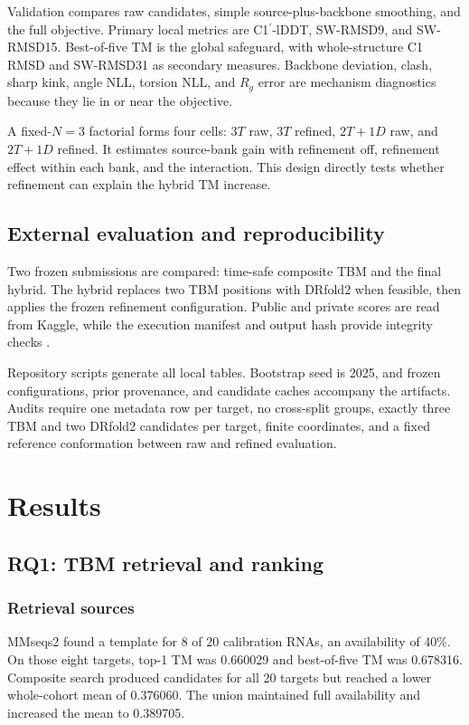 \documentclass[12pt,a4paper,oneside]{report}
\newcommand{\cprime}{C1$^{\prime}$}
\begin{document}
Validation compares raw candidates, simple source-plus-backbone smoothing, and the full
objective. Primary local metrics are \cprime{}-lDDT, SW-RMSD9, and SW-RMSD15. Best-of-five
TM is the global safeguard, with whole-structure C1 RMSD and SW-RMSD31 as secondary
measures. Backbone deviation, clash, sharp kink, angle NLL, torsion NLL, and $R_g$ error
are mechanism diagnostics because they lie in or near the objective.

A fixed-$N=3$ factorial forms four cells: $3T$ raw, $3T$ refined, $2T+1D$ raw, and
$2T+1D$ refined. It estimates source-bank gain with refinement off, refinement effect
within each bank, and the interaction. This design directly tests whether refinement can
explain the hybrid TM increase.

\section{External evaluation and reproducibility}

Two frozen submissions are compared: time-safe composite TBM and the final hybrid. The
hybrid replaces two TBM positions with DRfold2 when feasible, then applies the frozen
refinement configuration. Public and private scores are read from Kaggle, while the
execution manifest and output hash provide integrity checks \cite{kaggle_competition}.

Repository scripts generate all local tables. Bootstrap seed is 2025, and frozen
configurations, prior provenance, and candidate caches accompany the artifacts. Audits
require one metadata row per target, no cross-split groups, exactly three TBM and two
DRfold2 candidates per target, finite coordinates, and a fixed reference conformation
between raw and refined evaluation.

\chapter{Results}
\label{chap:results_en}

\section{RQ1: TBM retrieval and ranking}

\subsection{Retrieval sources}

MMseqs2 found a template for 8 of 20 calibration RNAs, an availability of 40\%. On those
eight targets, top-1 TM was 0.660029 and best-of-five TM was 0.678316. Composite search
produced candidates for all 20 targets but reached a lower whole-cohort mean of 0.376060.
The union maintained full availability and increased the mean to 0.389705.
\end{document}

